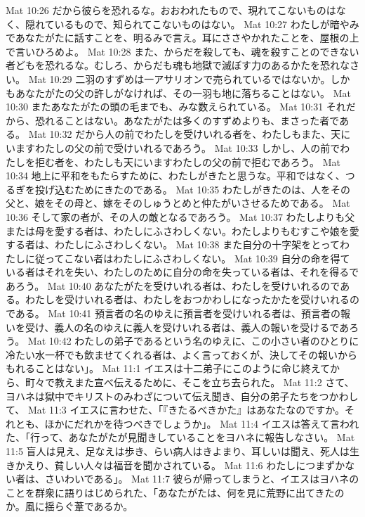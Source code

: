 Mat 10:26  だから彼らを恐れるな。おおわれたもので、現れてこないものはなく、隠れているもので、知られてこないものはない。
Mat 10:27  わたしが暗やみであなたがたに話すことを、明るみで言え。耳にささやかれたことを、屋根の上で言いひろめよ。
Mat 10:28  また、からだを殺しても、魂を殺すことのできない者どもを恐れるな。むしろ、からだも魂も地獄で滅ぼす力のあるかたを恐れなさい。
Mat 10:29  二羽のすずめは一アサリオンで売られているではないか。しかもあなたがたの父の許しがなければ、その一羽も地に落ちることはない。
Mat 10:30  またあなたがたの頭の毛までも、みな数えられている。
Mat 10:31  それだから、恐れることはない。あなたがたは多くのすずめよりも、まさった者である。
Mat 10:32  だから人の前でわたしを受けいれる者を、わたしもまた、天にいますわたしの父の前で受けいれるであろう。
Mat 10:33  しかし、人の前でわたしを拒む者を、わたしも天にいますわたしの父の前で拒むであろう。
Mat 10:34  地上に平和をもたらすために、わたしがきたと思うな。平和ではなく、つるぎを投げ込むためにきたのである。
Mat 10:35  わたしがきたのは、人をその父と、娘をその母と、嫁をそのしゅうとめと仲たがいさせるためである。
Mat 10:36  そして家の者が、その人の敵となるであろう。
Mat 10:37  わたしよりも父または母を愛する者は、わたしにふさわしくない。わたしよりもむすこや娘を愛する者は、わたしにふさわしくない。
Mat 10:38  また自分の十字架をとってわたしに従ってこない者はわたしにふさわしくない。
Mat 10:39  自分の命を得ている者はそれを失い、わたしのために自分の命を失っている者は、それを得るであろう。
Mat 10:40  あなたがたを受けいれる者は、わたしを受けいれるのである。わたしを受けいれる者は、わたしをおつかわしになったかたを受けいれるのである。
Mat 10:41  預言者の名のゆえに預言者を受けいれる者は、預言者の報いを受け、義人の名のゆえに義人を受けいれる者は、義人の報いを受けるであろう。
Mat 10:42  わたしの弟子であるという名のゆえに、この小さい者のひとりに冷たい水一杯でも飲ませてくれる者は、よく言っておくが、決してその報いからもれることはない」。
Mat 11:1  イエスは十二弟子にこのように命じ終えてから、町々で教えまた宣べ伝えるために、そこを立ち去られた。
Mat 11:2  さて、ヨハネは獄中でキリストのみわざについて伝え聞き、自分の弟子たちをつかわして、
Mat 11:3  イエスに言わせた、「『きたるべきかた』はあなたなのですか。それとも、ほかにだれかを待つべきでしょうか」。
Mat 11:4  イエスは答えて言われた、「行って、あなたがたが見聞きしていることをヨハネに報告しなさい。
Mat 11:5  盲人は見え、足なえは歩き、らい病人はきよまり、耳しいは聞え、死人は生きかえり、貧しい人々は福音を聞かされている。
Mat 11:6  わたしにつまずかない者は、さいわいである」。
Mat 11:7  彼らが帰ってしまうと、イエスはヨハネのことを群衆に語りはじめられた、「あなたがたは、何を見に荒野に出てきたのか。風に揺らぐ葦であるか。
